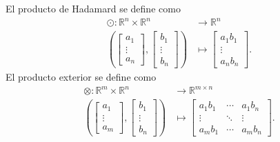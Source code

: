 El producto de Hadamard se define como
\begin{align*}
	\odot\colon\mathbb{R}^{n}\times\mathbb{R}^{n} & \longrightarrow\mathbb{R}^{n} \\
	\left(
	\begin{bmatrix}
			a_{1}  \\
			\vdots \\
			a_{n}
		\end{bmatrix},
	\begin{bmatrix}
			b_{1}  \\
			\vdots \\
			b_{n}
		\end{bmatrix}
	\right)                                       & \longmapsto
	\begin{bmatrix}
		a_{1}b_{1} \\
		\vdots     \\
		a_{n}b_{n}
	\end{bmatrix}.
\end{align*}
El producto exterior se define como
\begin{align*}
	\otimes\colon\mathbb{R}^{m}\times\mathbb{R}^{n} & \longrightarrow\mathbb{R}^{m\times n} \\
	\left(
	\begin{bmatrix}
			a_{1}  \\
			\vdots \\
			a_{m}
		\end{bmatrix},
	\begin{bmatrix}
			b_{1}  \\
			\vdots \\
			b_{n}
		\end{bmatrix}
	\right)                                         & \longmapsto
	\begin{bmatrix}
		a_{1}b_{1} & \cdots & a_{1}b_{n} \\
		\vdots     & \ddots & \vdots     \\
		a_{m}b_{1} & \cdots & a_{m}b_{n}
	\end{bmatrix}.
\end{align*}
\nocite{*}
\printbibliography[title={Referencias},heading=bibintoc]


